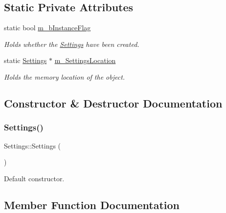 \subsection*{Static Private Attributes}
\begin{DoxyCompactItemize}
\item 
static bool \hyperlink{class_settings_ab86ba9c14d4dffa6c2f8df0a1f9b12ed}{m\+\_\+b\+Instance\+Flag}
\begin{DoxyCompactList}\small\item\em Holds whether the \hyperlink{class_settings}{Settings} have been created. \end{DoxyCompactList}\item 
static \hyperlink{class_settings}{Settings} $\ast$ \hyperlink{class_settings_ab20dedb7bb5225046eb13040b4084be6}{m\+\_\+\+Settings\+Location}
\begin{DoxyCompactList}\small\item\em Holds the memory location of the object. \end{DoxyCompactList}\end{DoxyCompactItemize}


\subsection{Constructor \& Destructor Documentation}
\mbox{\label{class_settings_ab7169a6eefce79566dd07db3b1e5e967}} 
\subsubsection{\texorpdfstring{Settings()}{Settings()}}
{\footnotesize\ttfamily Settings\+::\+Settings (\begin{DoxyParamCaption}{ }\end{DoxyParamCaption})}



Default constructor. 



\subsection{Member Function Documentation}
\mbox{\label{class_settings_a09f352700bc34e1c4cc6ce50a6e54371}} 
